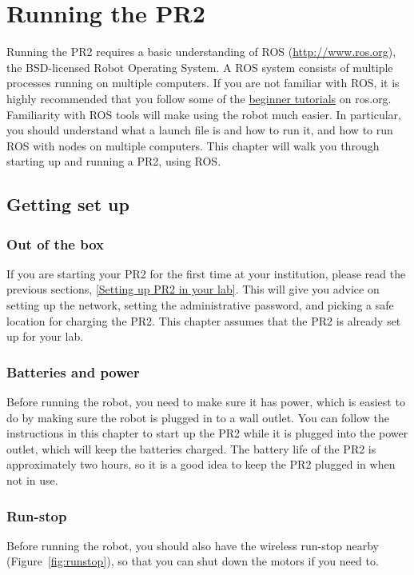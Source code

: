 \chapter{Running the PR2}
Running the PR2 requires a basic understanding of ROS (\href{http://www.ros.org}{http://www.ros.org}), the BSD-licensed 
Robot Operating System.  A ROS system consists of multiple processes running on multiple computers.  If you are not 
familiar with ROS, it is highly recommended that you follow some of the \href{http://www.ros.org/wiki/ROS/Tutorials}{beginner tutorials} 
on ros.org. Familiarity with ROS tools will make using the robot much easier.  In particular, you should understand 
what a launch file is and how to run it, and how to run ROS with nodes on multiple computers. This chapter will walk 
you through starting up and running a PR2, using ROS.

\section{Getting set up}
\subsection{Out of the box}
If you are starting your PR2 for the first time at your institution, please read the previous sections, \ref{Setting up PR2 in your lab}.  
This will give you advice on setting up the network, setting the administrative password, and picking a safe location for 
charging the PR2.  This chapter assumes that the PR2 is already set up for your lab.
\subsection{Batteries and power}
Before running the robot, you need to make sure it has power, which is easiest to do by making sure the robot is plugged in to a wall outlet. You can follow the instructions in this chapter to start up the PR2 while it is plugged into the power outlet, which will keep the batteries charged.  The battery life of the PR2 is approximately two hours, so it is a good idea to keep the PR2 plugged in when not in use.  


\subsection{Run-stop}
Before running the robot, you should also have the wireless run-stop 
nearby (Figure~\ref{fig:runstop}), so that you can shut down the motors if you need to. 

